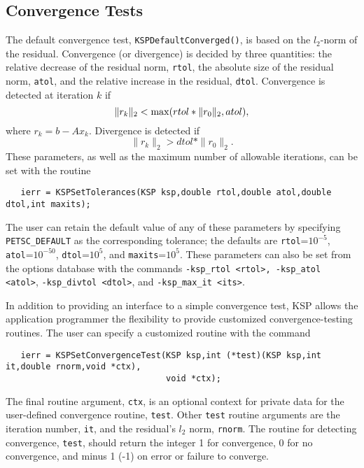 \subsection{Convergence Tests}
\label{section:convergencetests}

The default convergence test, {\tt KSPDefaultConverged()}, is 
based on the $l_2$-norm of the residual. Convergence 
(or divergence) is decided by three quantities:
the relative decrease of the residual norm, {\tt rtol}, the absolute 
size of the residual norm, {\tt atol}, and the relative increase in the 
residual, {\tt dtol}.  Convergence is detected at iteration $k$ if
\[  \| r_k \|_2 < {\rm max} ( rtol * \| r_0 \|_2, atol ), \]
where $r_k = b - A x_k$.  Divergence is detected if
\[  \| r_k \|_2 > dtol * \| r_0 \|_2. \]
These parameters, as well as the maximum number of allowable iterations, 
can be set with the routine 
\begin{verbatim}
   ierr = KSPSetTolerances(KSP ksp,double rtol,double atol,double dtol,int maxits);
\end{verbatim}
The user can retain the default value of any of these parameters by
specifying {\tt PETSC\_DEFAULT}  as the 
corresponding tolerance; the
defaults are {\tt rtol}=$10^{-5}$, {\tt atol}=$10^{-50}$,
{\tt dtol}=$10^{5}$, and {\tt maxits}=$10^5$.
These parameters can also be set from the options database with the 
commands {\tt -ksp\_rtol <rtol>, -ksp\_atol <atol>}, {\tt -ksp\_divtol <dtol>},
  
and {\tt -ksp\_max\_it <its>}. 

In addition to providing an interface to a simple convergence test,
KSP allows the application programmer the flexibility to provide 
customized convergence-testing routines.  
The user can specify a customized 
routine with the command 
\begin{verbatim}
   ierr = KSPSetConvergenceTest(KSP ksp,int (*test)(KSP ksp,int it,double rnorm,void *ctx),
                                void *ctx);
\end{verbatim}
The final routine argument, {\tt ctx}, is an optional context for private
data for the user-defined convergence routine, {\tt test}.  Other
{\tt test} routine arguments are the iteration
number, {\tt it}, and the residual's $l_2$ norm, {\tt rnorm}.
The routine for detecting convergence, {\tt test}, should return the 
integer 1 for convergence, 0 for no convergence, and minus 1 (-1) on error or 
failure to converge.  
 

